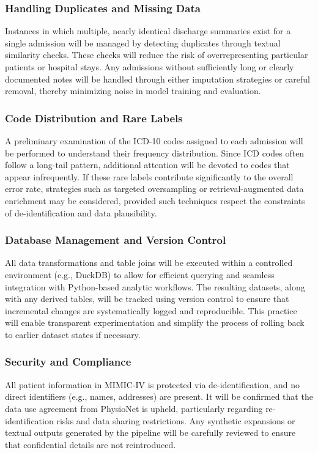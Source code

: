 \subsubsection{Handling Duplicates and Missing Data}\label{sec:p1:duplicates_missing}
Instances in which multiple, nearly identical discharge summaries exist for a single admission will be managed by detecting duplicates through textual similarity checks. These checks will reduce the risk of overrepresenting particular patients or hospital stays. Any admissions without sufficiently long or clearly documented notes will be handled through either imputation strategies or careful removal, thereby minimizing noise in model training and evaluation.

\subsubsection{Code Distribution and Rare Labels}\label{sec:p1:code_distribution}
A preliminary examination of the ICD-10 codes assigned to each admission will be performed to understand their frequency distribution. Since ICD codes often follow a long-tail pattern, additional attention will be devoted to codes that appear infrequently. If these rare labels contribute significantly to the overall error rate, strategies such as targeted oversampling or retrieval-augmented data enrichment may be considered, provided such techniques respect the constraints of de-identification and data plausibility.

\subsubsection{Database Management and Version Control}\label{sec:p1:db_management}
All data transformations and table joins will be executed within a controlled environment (e.g., DuckDB) to allow for efficient querying and seamless integration with Python-based analytic workflows. The resulting datasets, along with any derived tables, will be tracked using version control to ensure that incremental changes are systematically logged and reproducible. This practice will enable transparent experimentation and simplify the process of rolling back to earlier dataset states if necessary.

\subsubsection{Security and Compliance}\label{sec:p1:security_compliance}
All patient information in MIMIC-IV is protected via de-identification, and no direct identifiers (e.g., names, addresses) are present. It will be confirmed that the data use agreement from PhysioNet is upheld, particularly regarding re-identification risks and data sharing restrictions. Any synthetic expansions or textual outputs generated by the pipeline will be carefully reviewed to ensure that confidential details are not reintroduced.


